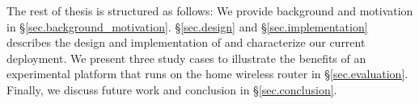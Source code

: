 The rest of thesis is structured as follows: We provide background and motivation in \S{\ref{sec.background_motivation}}. \S{\ref{sec.design}} and \S{\ref{sec.implementation}} describes the design and implementation of \sysname and characterize our current deployment. We present three study cases to illustrate the benefits of an experimental platform that runs on the home wireless router in \S{\ref{sec.evaluation}}. Finally, we discuss future work and conclusion in \S{\ref{sec.conclusion}}. 